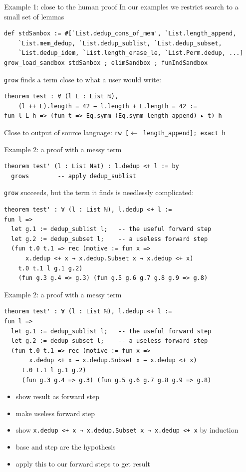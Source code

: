 \documentclass[aspectratio=169]{beamer}
\newcommand{\grow}{\texttt{grow}}      %
\begin{document}
\begin{frame}[fragile]{Example 1: close to the human proof}
In our examples we restrict search to a small set of lemmas
\begin{lstlisting}
def stdSanbox := #[`List.dedup_cons_of_mem', `List.length_append,
	`List.mem_dedup, `List.dedup_sublist, `List.dedup_subset,
	`List.dedup_idem, `List.length_erase_le, `List.Perm.dedup, ...]
grow_load_sandbox stdSanbox ; elimSandbox ; funIndSandbox
\end{lstlisting}
\grow{} finds a term close to what a user would write:
\begin{lstlisting}
theorem test : ∀ (l L : List ℕ),
    (l ++ L).length = 42 → l.length + L.length = 42 :=
fun l L h => (fun t => Eq.symm (Eq.symm length_append) ▸ t) h
\end{lstlisting}
Close to output of source language: \texttt{rw [$\leftarrow$ length\_append]; exact h}
\end{frame}

\begin{frame}[fragile]{Example 2: a proof with a messy term}
\begin{lstlisting}
theorem test' (l : List Nat) : l.dedup <+ l := by
  grows        -- apply dedup_sublist
\end{lstlisting}
  \grow{} succeeds, but the term it finds is \alert{needlessly complicated}:
\begin{lstlisting}
theorem test' : ∀ (l : List ℕ), l.dedup <+ l :=
fun l =>
  let g.1 := dedup_sublist l;   -- the useful forward step
  let g.2 := dedup_subset l;    -- a useless forward step
  (fun t.0 t.1 => rec (motive := fun x =>
      x.dedup <+ x → x.dedup.Subset x → x.dedup <+ x)
    t.0 t.1 l g.1 g.2)
    (fun g.3 g.4 => g.3) (fun g.5 g.6 g.7 g.8 g.9 => g.8)
\end{lstlisting}
\end{frame}

\begin{frame}[fragile]{Example 2: a proof with a messy term}
\begin{lstlisting}
theorem test' : ∀ (l : List ℕ), l.dedup <+ l :=
fun l =>
  let g.1 := dedup_sublist l;   -- the useful forward step
  let g.2 := dedup_subset l;    -- a useless forward step
  (fun t.0 t.1 => rec (motive := fun x =>
       x.dedup <+ x → x.dedup.Subset x → x.dedup <+ x)
     t.0 t.1 l g.1 g.2)
     (fun g.3 g.4 => g.3) (fun g.5 g.6 g.7 g.8 g.9 => g.8)
\end{lstlisting}
\begin{itemize}
\item show result as forward step
\item make useless forward step
\item show \texttt{x.dedup <+ x → x.dedup.Subset x → x.dedup <+ x} by induction
\item base and step are the hypothesis
\item apply this to our forward steps to get result
\end{itemize}
\end{frame}
\end{document}
